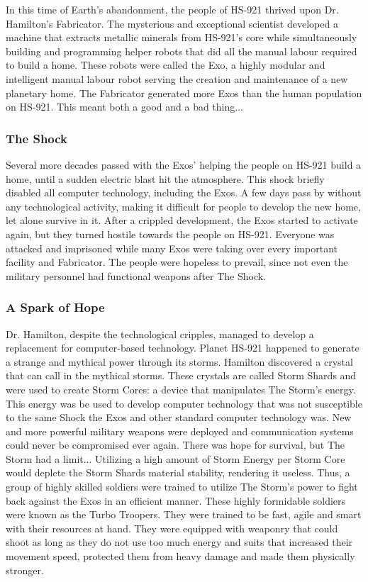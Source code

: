 \documentclass[12pt]{article}
\begin{document}
In this time of Earth's abandonment, the people of HS-921 thrived upon Dr. Hamilton's Fabricator. The mysterious and exceptional scientist developed a machine that extracts metallic minerals from HS-921's core while simultaneously building and programming helper robots that did all the manual labour required to build a home. These robots were called the Exo, a highly modular and intelligent manual labour robot serving the creation and maintenance of a new planetary home. The Fabricator generated more Exos than the human population on HS-921. This meant both a good and a bad thing...

\subsubsection{The Shock}

Several more decades passed with the Exos' helping the people on HS-921 build a home, until a sudden electric blast hit the atmosphere. This shock briefly disabled all computer technology, including the Exos. A few days pass by without any technological activity, making it difficult for people to develop the new home, let alone survive in it. After a crippled development, the Exos started to activate again, but they turned hostile towards the people on HS-921. Everyone was attacked and imprisoned while many Exos were taking over every important facility and Fabricator. The people were hopeless to prevail, since not even the military personnel had functional weapons after The Shock. 

\subsubsection{A Spark of Hope}

Dr. Hamilton, despite the technological cripples, managed to develop a replacement for computer-based technology. Planet HS-921 happened to generate a strange and mythical power through its storms. Hamilton  discovered a crystal that can call in the mythical storms. These crystals are called Storm Shards and were used to create Storm Cores: a device that manipulates The Storm's energy. This energy was be used to develop computer technology that was not susceptible to the same Shock the Exos and other standard computer technology was. New and more powerful military weapons were deployed and communication systems could never be compromised ever again. There was hope for survival, but The Storm had a limit... Utilizing a high amount of Storm Energy per Storm Core would deplete the Storm Shards material stability, rendering it useless. Thus, a group of highly skilled soldiers were trained to utilize The Storm's power to fight back against the Exos in an efficient manner. These highly formidable soldiers were known as the Turbo Troopers. They were trained to be fast, agile and smart with their resources at hand. They were equipped with weaponry that could shoot as long as they do not use too much energy and suits that increased their movement speed, protected them from heavy damage and made them physically stronger. 
\end{document}
